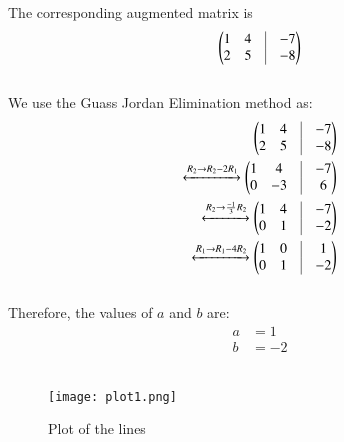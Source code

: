 \documentclass[journal,12pt,twocolumn]{IEEEtran}
\begin{document}
The corresponding augmented matrix is
\begin{align}
    	\myvec{
		1 & 4 & \vrule & -7 \\
		2 & 5 & \vrule & -8 \\
	}
\end{align}\\
We use the Guass Jordan Elimination method as:
\begin{align}
	\myvec{
		1 & 4 & \vrule & -7 \\
		2 & 5 & \vrule & -8 \\
	}
	\\
	\xleftrightarrow[]{R_2 \rightarrow R_2 - 2R_1}
	\myvec{
		1 & 4 & \vrule & -7 \\
		0 & -3 & \vrule & 6 \\
	}
	\\
	\xleftrightarrow[]{R_2\rightarrow \frac{-1}{3}R_2}
	\myvec{
		1 & 4 & \vrule & -7 \\
		0 & 1 & \vrule & -2 \\
	}
	\\
	\xleftrightarrow[]{R_1 \rightarrow R_1 - 4R_2}
	\myvec{
		1 & 0 & \vrule & 1 \\
		0 & 1 & \vrule & -2 \\
	}
\end{align}\\
Therefore, the values of $a$ and $b$ are:
\begin{align}
	a &= 1 \\
	b & = -2
\end{align}\\
\begin{figure}[!h]
\centering
\texttt{[image: plot1.png]}
\caption{Plot of the lines}
\label{plt_1}
\end{figure}
\end{document}
